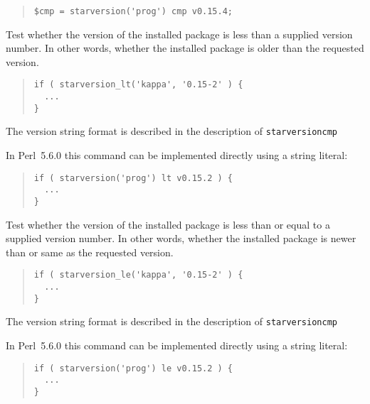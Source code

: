 \documentclass[twoside,11pt]{article}
\newenvironment{myquote}{\begin{quote}\begin{small}}{\end{small}\end{quote}}
\newcommand{\perl}{\xref{\textsf{Perl}}{sun193}{}}
\newcommand{\xref}[3]{#1}
\renewcommand{\_}{\texttt{\symbol{95}}}
\begin{document}
\begin{description}
\begin{myquote}
\begin{verbatim}
$cmp = starversion('prog') cmp v0.15.4;
\end{verbatim} 
\end{myquote} %

\item[starversion\_lt] \mbox{}
  
  Test whether the version of the installed package is less than a supplied
  version number. In other words, whether the installed package is older than
  the requested version.

\begin{myquote}
\begin{verbatim}
if ( starversion_lt('kappa', '0.15-2' ) {
  ...
}
\end{verbatim}
\end{myquote}

The version string format is described in the description of
\texttt{starversion\_cmp}



In \perl\ 5.6.0 this command can be implemented directly using a string literal:

\begin{myquote}
\begin{verbatim}
if ( starversion('prog') lt v0.15.2 ) {
  ...
}
\end{verbatim}
\end{myquote}

\item[starversion\_le] \mbox{}

Test whether the version of the installed package is less than 
or equal to a supplied version number. In other words, whether the installed
package is newer than or same as the requested version.

\begin{myquote}
\begin{verbatim}
if ( starversion_le('kappa', '0.15-2' ) {
  ...
}
\end{verbatim}
\end{myquote}

The version string format is described in the description of
\texttt{starversion\_cmp}



In \perl\ 5.6.0 this command can be implemented directly using a 
string literal:

\begin{myquote}
\begin{verbatim}
if ( starversion('prog') le v0.15.2 ) {
  ...
}
\end{verbatim}
\end{myquote}


\end{description}
\end{document}
